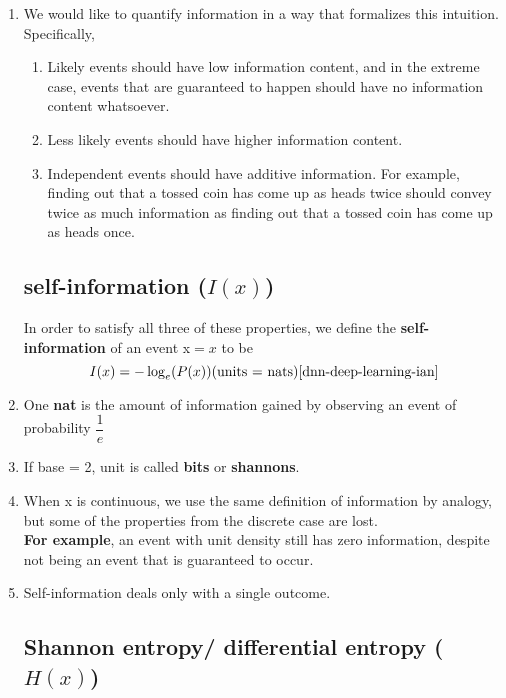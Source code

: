 \begin{enumerate}[itemsep=0.2cm]
    \item We would like to quantify information in a way that formalizes this intuition.\\
    Specifically,
    \begin{enumerate}
        \item Likely events should have low information content, and in the extreme case, events that are guaranteed to happen should have no information content whatsoever.

        \item Less likely events should have higher information content.

        \item Independent events should have additive information. For example, finding out that a tossed coin has come up as heads twice should convey twice as much information as finding out that a tossed coin has come up as heads once.
    \end{enumerate}

\subsection{self-information ($I(x)$)} \label{probability: self-information}
    
    In order to satisfy all three of these properties, we define the \textbf{self-information} of an event x$=x$ to be
    \[
        I(x) 
        = -\log_e(P(x))
        \hfill \text{(units = nats)}
        \hfill \text{\cite{dnn-deep-learning-ian}}
    \]

    \item One \textbf{nat} is the amount of information gained by observing an event of probability $\dfrac{1}{e}$

    \item If base = 2, unit is called \textbf{bits} or \textbf{shannons}.

    \item When x is continuous, we use the same definition of information by analogy, but some of the properties from the discrete case are lost.\\
    \textbf{For example}, an event with unit density still has zero information, despite not being an event that is guaranteed to occur.

    \item Self-information deals only with a single outcome.

\subsection{Shannon entropy/ differential entropy ($H(x)$)} \label{probability: Shannon entropy/ differential entropy}


\end{enumerate}
